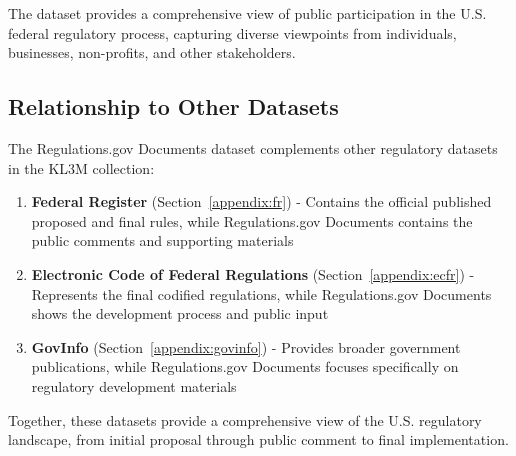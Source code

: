 The dataset provides a comprehensive view of public participation in the U.S. federal regulatory process, capturing diverse viewpoints from individuals, businesses, non-profits, and other stakeholders.

\subsection{Relationship to Other Datasets}

The Regulations.gov Documents dataset complements other regulatory datasets in the KL3M collection:

\begin{enumerate}
    \item \textbf{Federal Register} (Section~\ref{appendix:fr}) - Contains the official published proposed and final rules, while Regulations.gov Documents contains the public comments and supporting materials
    
    \item \textbf{Electronic Code of Federal Regulations} (Section~\ref{appendix:ecfr}) - Represents the final codified regulations, while Regulations.gov Documents shows the development process and public input
    
    \item \textbf{GovInfo} (Section~\ref{appendix:govinfo}) - Provides broader government publications, while Regulations.gov Documents focuses specifically on regulatory development materials
\end{enumerate}

Together, these datasets provide a comprehensive view of the U.S. regulatory landscape, from initial proposal through public comment to final implementation.